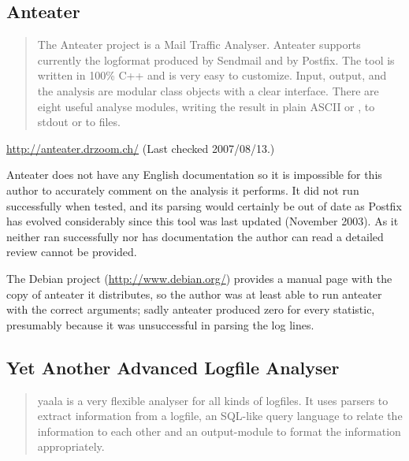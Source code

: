 
\subsection{Anteater}

\begin{quotation}

    The Anteater project is a Mail Traffic Analyser. Anteater supports
    currently the logformat produced by Sendmail and by Postfix. The tool
    is written in 100\% C++ and is very easy to customize. Input, output,
    and the analysis are modular class objects with a clear interface.
    There are eight useful analyse modules, writing the result in plain
    ASCII or \HTML{}, to stdout or to files.

\end{quotation}

\noindent{}\url{http://anteater.drzoom.ch/} \newline{}
(Last checked 2007/08/13.)

Anteater does not have any English documentation so it is impossible for
this author to accurately comment on the analysis it performs.  It did not
run successfully when tested, and its parsing would certainly be out of
date as Postfix has evolved considerably since this tool was last updated
(November 2003).  As it neither ran successfully nor has documentation the
author can read a detailed review cannot be provided.

The Debian project (\url{http://www.debian.org/}) provides a manual page
with the copy of anteater it distributes, so the author was at least able
to run anteater with the correct arguments; sadly anteater produced zero
for every statistic, presumably because it was unsuccessful in parsing the
log lines.

\subsection{Yet Another Advanced Logfile Analyser}

\begin{quotation}

    yaala is a very flexible analyser for all kinds of logfiles. It uses
    parsers to extract information from a logfile, an SQL-like query
    language to relate the information to each other and an output-module
    to format the information appropriately.

\end{quotation}

